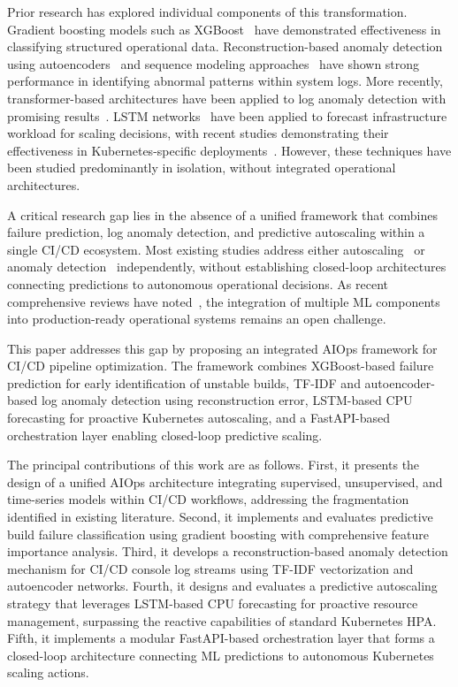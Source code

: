 \documentclass[sn-nature]{sn-jnl}
\theoremstyle{thmstyleone}
\theoremstyle{thmstyletwo}
\theoremstyle{thmstylethree}
\begin{document}
Prior research has explored individual components of this transformation. Gradient boosting models such as XGBoost~\cite{chen2016xgboost} have demonstrated effectiveness in classifying structured operational data. Reconstruction-based anomaly detection using autoencoders~\cite{sakurada2014anomaly} and sequence modeling approaches~\cite{du2017deeplog, meng2019loganomaly} have shown strong performance in identifying abnormal patterns within system logs. More recently, transformer-based architectures have been applied to log anomaly detection with promising results~\cite{liao2025logtransformer, zhou2024logllm}. LSTM networks~\cite{hochreiter1997lstm} have been applied to forecast infrastructure workload for scaling decisions, with recent studies demonstrating their effectiveness in Kubernetes-specific deployments~\cite{guruge2025prophet, dasilva2025adaptive}. However, these techniques have been studied predominantly in isolation, without integrated operational architectures.

A critical research gap lies in the absence of a unified framework that combines failure prediction, log anomaly detection, and predictive autoscaling within a single CI/CD ecosystem. Most existing studies address either autoscaling~\cite{lorido2014autoscaling, machiraju2026mlautoscaling} or anomaly detection~\cite{le2022log, kanahols2025timeseries} independently, without establishing closed-loop architectures connecting predictions to autonomous operational decisions. As recent comprehensive reviews have noted~\cite{zota2025agentic, bayram2025trustworthy}, the integration of multiple ML components into production-ready operational systems remains an open challenge.

This paper addresses this gap by proposing an integrated AIOps framework for CI/CD pipeline optimization. The framework combines XGBoost-based failure prediction for early identification of unstable builds, TF-IDF and autoencoder-based log anomaly detection using reconstruction error, LSTM-based CPU forecasting for proactive Kubernetes autoscaling, and a FastAPI-based orchestration layer enabling closed-loop predictive scaling.

The principal contributions of this work are as follows. First, it presents the design of a unified AIOps architecture integrating supervised, unsupervised, and time-series models within CI/CD workflows, addressing the fragmentation identified in existing literature. Second, it implements and evaluates predictive build failure classification using gradient boosting with comprehensive feature importance analysis. Third, it develops a reconstruction-based anomaly detection mechanism for CI/CD console log streams using TF-IDF vectorization and autoencoder networks. Fourth, it designs and evaluates a predictive autoscaling strategy that leverages LSTM-based CPU forecasting for proactive resource management, surpassing the reactive capabilities of standard Kubernetes HPA. Fifth, it implements a modular FastAPI-based orchestration layer that forms a closed-loop architecture connecting ML predictions to autonomous Kubernetes scaling actions.
\end{document}
